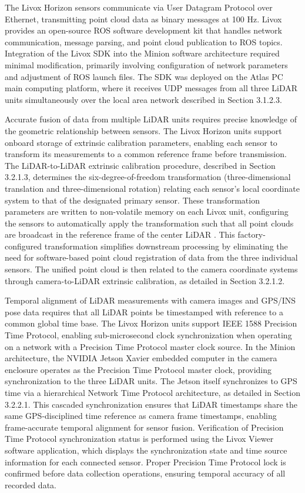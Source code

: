 \documentclass{erauthesis}
\begin{document}
The Livox Horizon sensors communicate via User Datagram Protocol over Ethernet, transmitting point cloud data as binary messages at 100 Hz.
Livox provides an open-source \ac{ROS} software development kit that handles network communication, message parsing, and point cloud publication to \ac{ROS} topics.
Integration of the Livox SDK into the Minion software architecture required minimal modification, primarily involving configuration of network parameters and adjustment of \ac{ROS} launch files.
The SDK was deployed on the Atlas PC main computing platform, where it receives UDP messages from all three \ac{LiDAR} units simultaneously over the local area network described in Section 3.1.2.3.

Accurate fusion of data from multiple \ac{LiDAR} units requires precise knowledge of the geometric relationship between sensors.
The Livox Horizon units support onboard storage of extrinsic calibration parameters, enabling each sensor to transform its measurements to a common reference frame before transmission.
The \ac{LiDAR}-to-\ac{LiDAR} extrinsic calibration procedure, described in Section 3.2.1.3, determines the six-degree-of-freedom transformation (three-dimensional translation and three-dimensional rotation) relating each sensor's local coordinate system to that of the designated primary sensor.
These transformation parameters are written to non-volatile memory on each Livox unit, configuring the sensors to automatically apply the transformation such that all point clouds are broadcast in the reference frame of the center \ac{LiDAR} \cite{thompson2023}.
This factory-configured transformation simplifies downstream processing by eliminating the need for software-based point cloud registration of data from the three individual sensors.
The unified point cloud is then related to the camera coordinate systems through camera-to-\ac{LiDAR} extrinsic calibration, as detailed in Section 3.2.1.2.

Temporal alignment of \ac{LiDAR} measurements with camera images and \ac{GPS}/\ac{INS} pose data requires that all \ac{LiDAR} points be timestamped with reference to a common global time base.
The Livox Horizon units support IEEE 1588 Precision Time Protocol, enabling sub-microsecond clock synchronization when operating on a network with a Precision Time Protocol master clock source.
In the Minion architecture, the NVIDIA Jetson Xavier embedded computer in the camera enclosure operates as the Precision Time Protocol master clock, providing synchronization to the three \ac{LiDAR} units.
The Jetson itself synchronizes to \ac{GPS} time via a hierarchical Network Time Protocol architecture, as detailed in Section 3.2.2.1.
This cascaded synchronization ensures that \ac{LiDAR} timestamps share the same \ac{GPS}-disciplined time reference as camera frame timestamps, enabling frame-accurate temporal alignment for sensor fusion.
Verification of Precision Time Protocol synchronization status is performed using the Livox Viewer software application, which displays the synchronization state and time source information for each connected sensor.
Proper Precision Time Protocol lock is confirmed before data collection operations, ensuring temporal accuracy of all recorded data.
\end{document}
